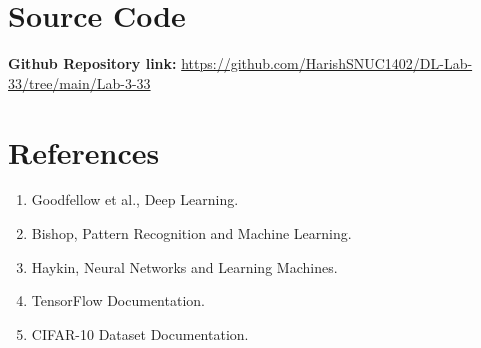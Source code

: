 \documentclass[11pt]{article}
\begin{document}
\section{Source Code}
\textbf{Github Repository link:}
\url{https://github.com/HarishSNUC1402/DL-Lab-33/tree/main/Lab-3-33}


\section{References}
\begin{enumerate}
    \item Goodfellow et al., Deep Learning. 
    \item Bishop, Pattern Recognition and Machine Learning. 
    \item Haykin, Neural Networks and Learning Machines. 
    \item TensorFlow Documentation. 
    \item CIFAR-10 Dataset Documentation. 
\end{enumerate}
\end{document}
